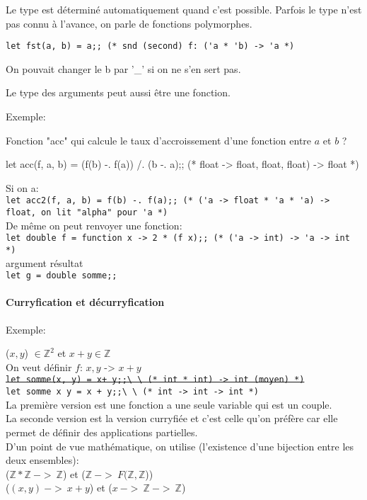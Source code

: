 \documentclass{article}
\newcommand{\code}[1]{\lstinline[style = mystyle]{#1}}
\begin{document}
						Le type est déterminé automatiquement quand c'est possible. Parfois le type n'est pas connu à l'avance, on parle de fonctions polymorphes.
						
						\code{let fst(a, b) = a;; (* snd (second) f: ('a * 'b) -> 'a *)}
						
						On pouvait changer le b par '\_' si on ne s'en sert pas.
						
						Le type des arguments peut aussi être une fonction.
						
						Exemple:
						
						Fonction "acc" qui calcule le taux d'accroissement d'une fonction entre $a$ et $b$ ?
						
						\begin{case}
let acc(f, a, b) =
	(f(b) -. f(a)) /. (b -. a);; (* float -> float, float, float) -> float *)
						\end{case}
						
						Si on a:\\
						\code{let acc2(f, a, b) = f(b) -. f(a);; (* ('a -> float * 'a * 'a) -> float, on lit "alpha" pour 'a *)}\\
						De même on peut renvoyer une fonction:\\
						\code{let double f = function x -> 2 * (f x);; (* ('a -> int) -> 'a -> int *)}\\
						argument résultat\\%
						\code{let g = double somme;;}

					\paragraph{Curryfication et décurryfication}

						Exemple:
						
						($x, y$) $\in \mathbb{Z}^2$ et $x + y \in \mathbb{Z}$\\
						On veut définir $f$: $x, y$ -> $x + y$\\
						\sout{\code{let somme(x, y) = x+ y;;\ \ (* int * int) -> int (moyen) *)}}\\
						\code{let somme x y = x + y;;\ \ (* int -> int -> int *)}\\
						La première version est une fonction a une seule variable qui est un couple.\\
						La seconde version est la version curryfiée et c'est celle qu'on préfère car elle permet de définir des applications partielles.\\ %
						D'un point de vue mathématique, on utilise (l'existence d'une bijection entre les deux ensembles):\\
						($\mathbb{Z} * \mathbb{Z}\ ->\ \mathbb{Z}$) et ($\mathbb{Z}\ ->\ F(\mathbb{Z}, \mathbb{Z}$))\\
						($(x, y)\ ->\ x + y$) et ($x\ ->\ \mathbb{Z}\ ->\ \mathbb{Z}$)
\end{document}
